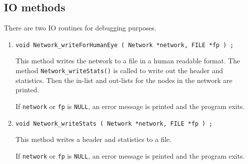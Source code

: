 \subsection{IO methods}
\label{subsection:Network:proto:IO}
\par
There are two IO routines for debugging purposes.
\par
\begin{enumerate}
\item
\begin{verbatim}
void Network_writeForHumanEye ( Network *network, FILE *fp ) ;
\end{verbatim}
\par
This method writes the network to a file in a human readable format.
The method {\tt Network\_writeStats()} 
is called to write out the
header and statistics. 
Then the in-list and out-lists for the nodes in the network are
printed.
\par {}
If {\tt network} or {\tt fp} is {\tt NULL},
an error message is printed and the program exits.
\item
\begin{verbatim}
void Network_writeStats ( Network *network, FILE *fp ) ;
\end{verbatim}
\par
This method writes a header and statistics to a file.
\par {}
If {\tt network} or {\tt fp} is {\tt NULL},
an error message is printed and the program exits.
\end{enumerate}
